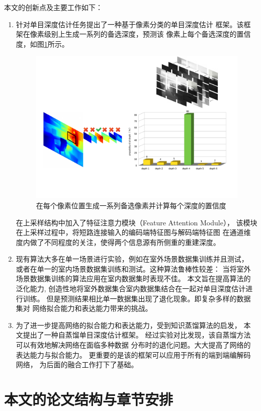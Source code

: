 本文的创新点及主要工作如下：
\begin{enumerate}
    \item 针对单目深度估计任务提出了一种基于像素分类的单目深度估计
    框架。该框架在像素级别上生成一系列的备选深度，预测该
    像素上每个备选深度的置信度，如图\ref{Pick}所示。
    \begin{figure}[htb]
        \centering
        \includegraphics[width=0.9\linewidth]{figure/Pick.pdf}
        \caption{在每个像素位置生成一系列备选像素并计算每个深度的置信度}
        \label{Pick}
    \end{figure}
    在上采样结构中加入了特征注意力模块（Feature Attention Module），
    该模块在上采样过程中，将短路连接输入的编码端特征图与解码端特征图
    在通道维度内做了不同程度的关注，使得两个信息源有所侧重的重建深度。
    \item 现有算法大多在单一场景进行实验，例如在室外场景数据集训练并且测试，
    或者在单一的室内场景数据集训练和测试。这种算法鲁棒性较差：
    当将室外场景数据集训练的算法应用在室内数据集时表现不佳。
    本文旨在提高算法的泛化能力,
    创造性地将室外数据集合室内数据集结合在一起对单目深度估计进行训练。
    但是预测结果相比单一数据集出现了退化现象。即复杂多样的数据集对
    网络拟合能力和表达能力带来的挑战。
    \item 为了进一步提高网络的拟合能力和表达能力，受到知识蒸馏算法的启发，
    本文提出了一种自蒸馏单目深度估计框架。
    经过实验对比发现，该自蒸馏方法可以有效地解决网络在面临多种数据
    分布时的退化问题。大大提高了网络的表达能力与拟合能力。
    更重要的是该的框架可以应用于所有的端到端编解码网络，
    为后面的融合工作打下了基础。
\end{enumerate}

\section{本文的论文结构与章节安排}

